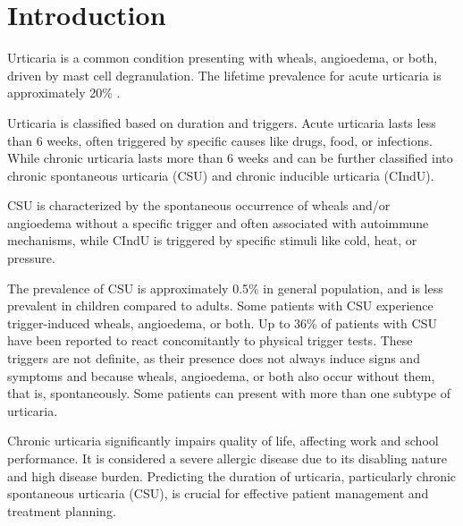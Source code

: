 \documentclass[preprint,12pt,authoryear]{elsarticle}
\begin{document}

\sloppy %

\section{Introduction}\label{Introduction}

Urticaria is a common condition presenting with wheals, angioedema, or both, driven by mast cell degranulation\citep{Zuberbier2021The,RadonjicHoesli2018Urticaria,Ring2012Urticaria}. The lifetime prevalence for acute urticaria is approximately 20\% \citep{Zuberbier2021The}. 

Urticaria is classified based on duration and triggers. Acute urticaria lasts less than 6 weeks, often triggered by specific causes like drugs, food, or infections. While chronic urticaria lasts more than 6 weeks and can be further classified into chronic spontaneous urticaria (CSU) and chronic inducible urticaria (CIndU)\citep{Zuberbier2021The,Ring2012Urticaria}. 

CSU is characterized by the spontaneous occurrence of wheals and/or angioedema without a specific trigger and often associated with autoimmune mechanisms\citep{Schettini2023Urticaria}, while CIndU is triggered by specific stimuli like cold, heat, or pressure\citep{Pozderac2020Chronic}. 

The prevalence of CSU is approximately 0.5\% in general population, and is less prevalent in children compared to adults\citep{Balp2015The, Poddighe2019LETTER, Labbene2023Prevalence}. Some patients with CSU experience trigger-induced wheals, angioedema, or both. Up to 36\% of patients with CSU have been reported to react concomitantly to physical trigger tests\citep{Dressler2018Chronic}. These triggers are not definite, as their presence does not always induce signs and symptoms and because wheals, angioedema, or both also occur without them, that is, spontaneously. Some patients can present with more than one subtype of urticaria\citep{Zuberbier2021The}. 

Chronic urticaria significantly impairs quality of life, affecting work and school performance. It is considered a severe allergic disease due to its disabling nature and high disease burden\citep{Zuberbier2021The}. Predicting the duration of urticaria, particularly chronic spontaneous urticaria (CSU), is crucial for effective patient management and treatment planning. 
\end{document}
